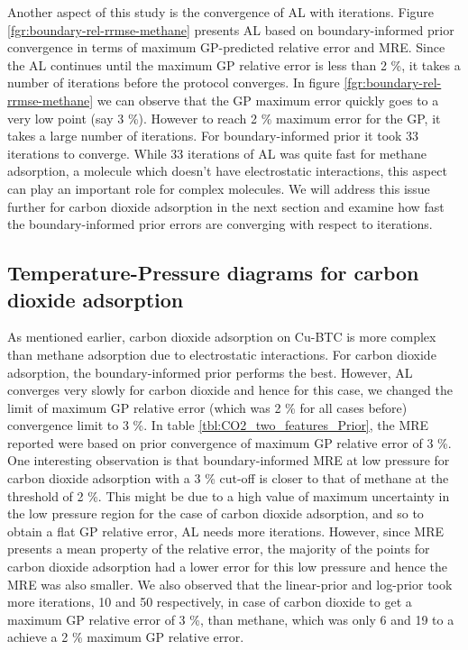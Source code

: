\documentclass[twoside,twocolumn,9pt]{article}
\begin{document}
Another aspect of this study is the convergence of AL with iterations. Figure \ref{fgr:boundary-rel-rrmse-methane} presents AL based on boundary-informed prior convergence in terms of maximum GP-predicted relative error and MRE. Since the AL continues until the maximum GP relative error is less than 2 \%, it takes a number of iterations before the protocol converges. In figure \ref{fgr:boundary-rel-rrmse-methane} we can observe that the GP maximum error quickly goes to a very low point (say 3 \%). However to reach 2 \% maximum error for the GP, it takes a large number of iterations. For boundary-informed prior it took 33 iterations to converge. While 33 iterations of AL was quite fast for methane adsorption, a molecule which doesn't have electrostatic interactions, this aspect can play an important role for complex molecules. We will address this issue further for carbon dioxide adsorption in the next section and examine how fast the boundary-informed prior errors are converging with respect to iterations.


\subsection{Temperature-Pressure diagrams for carbon dioxide adsorption}
As mentioned earlier, carbon dioxide adsorption on Cu-BTC is more complex than methane adsorption due to electrostatic interactions. For carbon dioxide adsorption, the boundary-informed prior performs the best. However, AL converges very slowly for carbon dioxide and hence for this case, we changed the limit of maximum GP relative error (which was 2 \% for all cases before) convergence limit to 3 \%. In table \ref{tbl:CO2_two_features_Prior}, the MRE reported were based on prior convergence of maximum GP relative error of 3 \%. One interesting observation is that boundary-informed MRE at low pressure for carbon dioxide adsorption with a 3 \% cut-off is closer to that of methane at the threshold of 2 \%. This might be due to a high value of maximum uncertainty in the low pressure region for the case of carbon dioxide adsorption, and so to obtain a flat GP relative error, AL needs more iterations. However, since MRE presents a mean property of the relative error, the majority of the points for carbon dioxide adsorption had a lower error for this low pressure and hence the MRE was also smaller. We also observed that the linear-prior and log-prior took more iterations, 10 and 50 respectively, in case of carbon dioxide to get a maximum GP relative error of 3 \%, than methane, which was only 6 and 19 to a achieve a 2 \% maximum GP relative error. 
\end{document}
